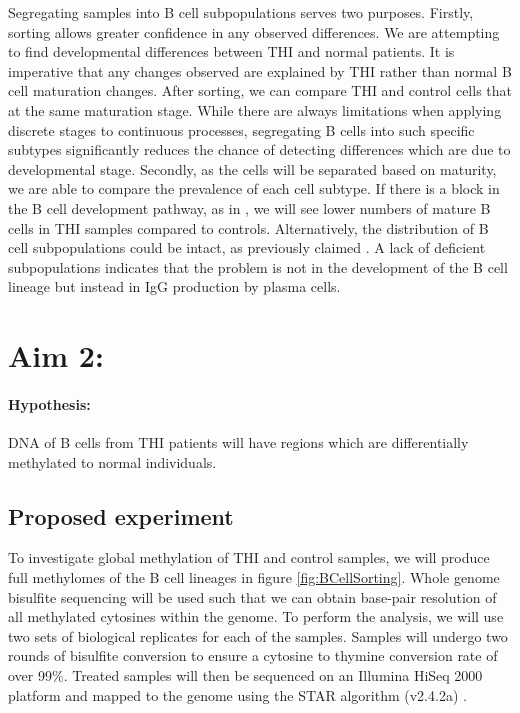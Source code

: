\documentclass[12pt]{article}
\begin{document}
		
			Segregating samples into B cell subpopulations serves two purposes. 
			Firstly, sorting allows greater confidence in any observed differences.
			We are attempting to find developmental differences between THI and normal patients. 
			It is imperative that any changes observed are explained by THI rather than normal B cell maturation changes.
			After sorting, we can compare THI and control cells that at the same maturation stage. 
			While there are always limitations when applying discrete stages to continuous processes, segregating B cells into such specific subtypes significantly reduces the chance of detecting differences which are due to developmental stage. 
			Secondly, as the cells will be separated based on maturity, we are able to compare the prevalence of each cell subtype. 
			If there is a block in the B cell development pathway, as in \citet{Tallmadge15}, we will see lower numbers of mature B cells in THI samples compared to controls.
			Alternatively, the distribution of B cell subpopulations could be intact, as previously claimed \citep{Tiller78,Stiemh80,Siegel81,Buckley83,Fiorilli86,Dressler89}.
			A lack of deficient subpopulations indicates that the problem is not in the development of the B cell lineage but instead in IgG production by plasma cells. 
			
	
	\section{Aim 2:}
	
		\paragraph{Hypothesis:} DNA of B cells from THI patients will have regions which are differentially methylated to normal individuals.
		
		\subsection{Proposed experiment}
		
			To investigate global methylation of THI and control samples, we will produce full methylomes of the B cell lineages in figure \ref{fig:BCellSorting}. 
			Whole genome bisulfite sequencing will be used such that we can obtain base-pair resolution of all methylated cytosines within the genome. 
			To perform the analysis, we will use two sets of biological replicates for each of the samples. 
			Samples will undergo two rounds of bisulfite conversion to ensure a cytosine to thymine conversion rate of over 99\%.
			Treated samples will then be sequenced on an Illumina HiSeq 2000 platform and mapped to the genome using the STAR algorithm (v2.4.2a) \citep{Dobin13}.
			
\end{document}
